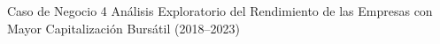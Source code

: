Caso de Negocio 4
Análisis Exploratorio del Rendimiento de las Empresas con Mayor Capitalización Bursátil (2018–2023)
